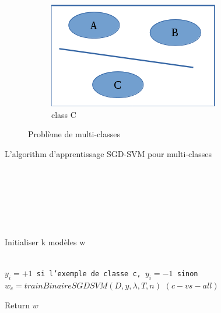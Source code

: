 \begin{figure}
        \begin{subfigure}[b]{0.30\textwidth}
                \includegraphics[width=\textwidth]{images/classc}
                \caption{class C}
                \label{classc}
        \end{subfigure}
        \caption{Problème de multi-classes}\label{1vsalldetail}
\end{figure}




\makeatletter
\def\BState{\State\hskip-\ALG@thistlm}
\makeatother


\begin{algorithm}
\caption{L'algorithm d'apprentissage SGD-SVM pour multi-classes}\label{mcsgdal}
\begin{algorithmic}[1]

\\
\\
\\
\\
\\
\\

\State Initialiser k modèles w

\\
\State \texttt{$y_i = +1$ si l'exemple de classe c, $y_i = -1$ sinon}
\State \texttt{$w_c = trainBinaireSGDSVM(D, y, \lambda, T, n)$} $(c-vs-all)$
\EndFor

\State Return $w$

\EndProcedure
\end{algorithmic}
\end{algorithm}

